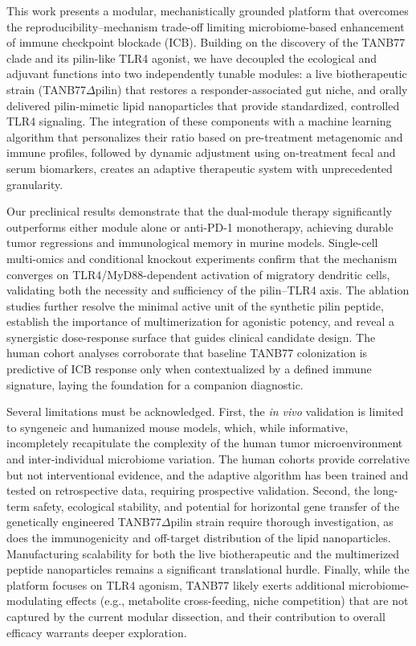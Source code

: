 \documentclass{article}
\begin{document}
This work presents a modular, mechanistically grounded platform that overcomes the reproducibility–mechanism trade-off limiting microbiome-based enhancement of immune checkpoint blockade (ICB). Building on the discovery of the TANB77 clade and its pilin-like TLR4 agonist, we have decoupled the ecological and adjuvant functions into two independently tunable modules: a live biotherapeutic strain (TANB77$\Delta$pilin) that restores a responder-associated gut niche, and orally delivered pilin-mimetic lipid nanoparticles that provide standardized, controlled TLR4 signaling. The integration of these components with a machine learning algorithm that personalizes their ratio based on pre-treatment metagenomic and immune profiles, followed by dynamic adjustment using on-treatment fecal and serum biomarkers, creates an adaptive therapeutic system with unprecedented granularity. 

Our preclinical results demonstrate that the dual-module therapy significantly outperforms either module alone or anti-PD-1 monotherapy, achieving durable tumor regressions and immunological memory in murine models. Single-cell multi-omics and conditional knockout experiments confirm that the mechanism converges on TLR4/MyD88-dependent activation of migratory dendritic cells, validating both the necessity and sufficiency of the pilin–TLR4 axis. The ablation studies further resolve the minimal active unit of the synthetic pilin peptide, establish the importance of multimerization for agonistic potency, and reveal a synergistic dose-response surface that guides clinical candidate design. The human cohort analyses corroborate that baseline TANB77 colonization is predictive of ICB response only when contextualized by a defined immune signature, laying the foundation for a companion diagnostic.

Several limitations must be acknowledged. First, the \textit{in vivo} validation is limited to syngeneic and humanized mouse models, which, while informative, incompletely recapitulate the complexity of the human tumor microenvironment and inter-individual microbiome variation. The human cohorts provide correlative but not interventional evidence, and the adaptive algorithm has been trained and tested on retrospective data, requiring prospective validation. Second, the long-term safety, ecological stability, and potential for horizontal gene transfer of the genetically engineered TANB77$\Delta$pilin strain require thorough investigation, as does the immunogenicity and off-target distribution of the lipid nanoparticles. Manufacturing scalability for both the live biotherapeutic and the multimerized peptide nanoparticles remains a significant translational hurdle. Finally, while the platform focuses on TLR4 agonism, TANB77 likely exerts additional microbiome-modulating effects (e.g., metabolite cross-feeding, niche competition) that are not captured by the current modular dissection, and their contribution to overall efficacy warrants deeper exploration.
\end{document}
